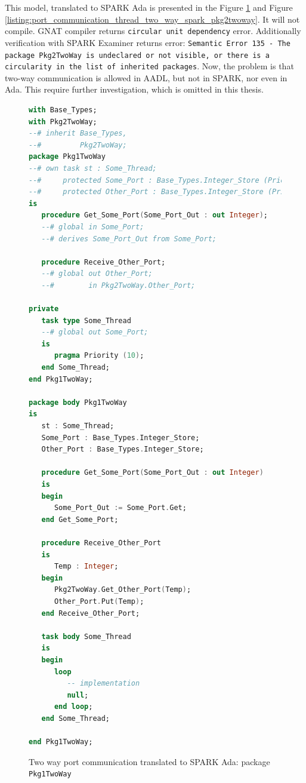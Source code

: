This model, translated to SPARK Ada is presented in the Figure \ref{listing:port_communication_thread_two_way_spark_pkg1twoway} and Figure \ref{listing:port_communication_thread_two_way_spark_pkg2twoway}. It will not compile. GNAT compiler returns \lstinline{circular unit dependency} error. Additionally verification with SPARK Examiner returns error: \lstinline{Semantic Error 135 - The package Pkg2TwoWay is undeclared or not visible, or there is a circularity in the list of inherited packages}. Now, the problem is that two-way communication is allowed in AADL, but not in SPARK, nor even in Ada. This require further investigation, which is omitted in this thesis.

\begin{figure}
\singlespacing
\begin{lstlisting}[language=ada, frame=single, gobble=0]
with Base_Types;
with Pkg2TwoWay;
--# inherit Base_Types,
--#         Pkg2TwoWay;
package Pkg1TwoWay
--# own task st : Some_Thread;
--#     protected Some_Port : Base_Types.Integer_Store (Priority => 10);
--#     protected Other_Port : Base_Types.Integer_Store (Priority => 10);
is
   procedure Get_Some_Port(Some_Port_Out : out Integer);
   --# global in Some_Port;
   --# derives Some_Port_Out from Some_Port;
   
   procedure Receive_Other_Port;
   --# global out Other_Port;
   --#        in Pkg2TwoWay.Other_Port;
   
private   
   task type Some_Thread     
   --# global out Some_Port;   
   is
      pragma Priority (10);
   end Some_Thread;
end Pkg1TwoWay;

package body Pkg1TwoWay
is
   st : Some_Thread;
   Some_Port : Base_Types.Integer_Store;
   Other_Port : Base_Types.Integer_Store;
   
   procedure Get_Some_Port(Some_Port_Out : out Integer)
   is
   begin
      Some_Port_Out := Some_Port.Get;
   end Get_Some_Port;
   
   procedure Receive_Other_Port
   is
      Temp : Integer;
   begin
      Pkg2TwoWay.Get_Other_Port(Temp);
      Other_Port.Put(Temp);
   end Receive_Other_Port;
      
   task body Some_Thread
   is   
   begin      
      loop         
         -- implementation
         null;         
      end loop;      
   end Some_Thread;

end Pkg1TwoWay;
\end{lstlisting} 
\doublespacing
\caption{Two way port communication translated to SPARK Ada: package \lstinline{Pkg1TwoWay}}
\label{listing:port_communication_thread_two_way_spark_pkg1twoway}
\end{figure}

